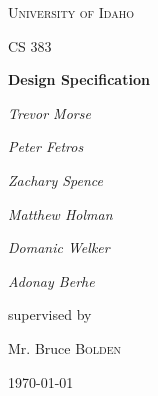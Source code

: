 \documentclass[12pt]{extarticle}
\begin{document}
\begin{titlepage}
	\centering
	{\scshape\LARGE University of Idaho \par}
	\vspace{1cm}
	{\scshape\Large CS 383\par}
	\vspace{1.5cm}
	{\huge\bfseries Design Specification\par}
	\vspace{2cm}
	{\Large\itshape Trevor Morse\par}
	{\Large\itshape Peter Fetros\par}
	{\Large\itshape Zachary Spence\par}
	{\Large\itshape Matthew Holman\par}
	{\Large\itshape Domanic Welker\par}
	{\Large\itshape Adonay Berhe\par}
	\vfill
	supervised by\par
	Mr. Bruce \textsc{Bolden}
	
	\vfill
	
	{\large \today\par}
\end{titlepage}
\tableofcontents
\clearpage








\cleardoublepage

\clearpage

\clearpage

\clearpage

\clearpage

\clearpage

\end{document}
